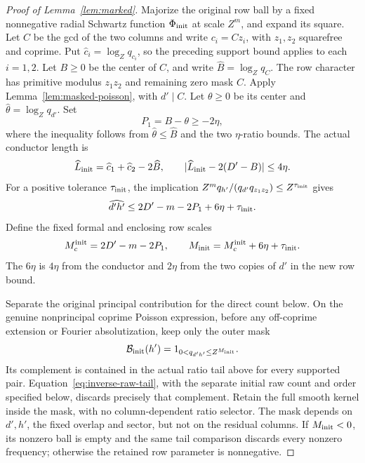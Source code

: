 \documentclass[11pt,a4paper]{article}
\numberwithin{equation}{section}
\numberwithin{figure}{section}
\theoremstyle{definition}
\theoremstyle{remark}
\begin{document}
\begin{proof}[Proof of Lemma~\ref{lem:marked}]
Majorize the original row ball by a fixed nonnegative radial Schwartz
function \(\Phi_{\rm init}\) at scale \(Z^m\), and expand its square.  Let \(C\) be the gcd
of the two columns and write \(c_i=Cz_i\), with \(z_1,z_2\) squarefree
and coprime.  Put \(\widehat c_i=\log_Zq_{c_i}\), so the preceding
support bound applies to each \(i=1,2\).  Let \(B\ge0\) be the center of \(C\), and write
\(\widehat B=\log_Zq_C\).  The row character has primitive modulus
\(z_1z_2\) and remaining zero mask \(C\).  Apply
Lemma~\ref{lem:masked-poisson}, with \(d'\mid C\).  Let \(\theta\ge0\)
be its center and \(\widehat\theta=\log_Zq_{d'}\).  Set
\[
 P_1=B-\theta\ge-2\eta,
\]
where the inequality follows from \(\widehat\theta\le\widehat B\) and
the two \(\eta\)-ratio bounds.  The actual conductor length is
\[
 \widehat L_{\rm init}=\widehat c_1+\widehat c_2-2\widehat B,
 \qquad |\widehat L_{\rm init}-2(D'-B)|\le4\eta.
\]
For a positive tolerance \(\tau_{\rm init}\), the implication
\(Z^mq_{h'}/(q_{d'}q_{z_1z_2})\le Z^{\tau_{\rm init}}\) gives
\[
 \widehat{d'h'}\le2D'-m-2P_1+6\eta+\tau_{\rm init}.
\]
Define the fixed formal and enclosing row scales
\begin{equation}\label{eq:inverse-initial-row}
 M_c^{\rm init}=2D'-m-2P_1,\qquad
 M_{\rm init}=M_c^{\rm init}+6\eta+\tau_{\rm init}.
\end{equation}
The \(6\eta\) is \(4\eta\) from the conductor and \(2\eta\) from the
two copies of \(d'\) in the new row bound.

Separate the original principal contribution for the direct count below.
On the genuine nonprincipal coprime Poisson expression, before any
off-coprime extension or Fourier absolutization, keep only the outer mask
\[
 \mathcal B_{\rm init}(h')=1_{0<q_{d'h'}\le Z^{M_{\rm init}}}.
\]
Its complement is contained in the actual ratio tail above for every
supported pair.  Equation~\eqref{eq:inverse-raw-tail}, with the separate
initial raw count and order specified below, discards precisely that
complement.  Retain the full smooth kernel inside the mask, with no
column-dependent ratio selector.  The mask depends on \(d',h'\), the
fixed overlap and sector, but not on the residual columns.  If
\(M_{\rm init}<0\), its nonzero ball is empty and the same tail comparison
discards every nonzero frequency; otherwise the retained row parameter is
nonnegative.


\end{proof}
\end{document}
